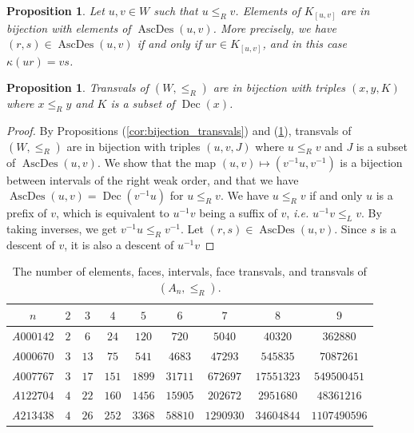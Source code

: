 \documentclass[leqno, 12pt]{amsart}
\numberwithin{equation}{section}
\newcommand{\AD}{\operatorname{AscDes}}
\newcommand{\Dec}{\operatorname{Dec}}
\numberwithin{equation}{section}
\newtheorem{prop}[thm]{Proposition}
\theoremstyle{remark}
\begin{document}
	\begin{prop}
		Let $u,v\in W$ such that $u\le_R v$. Elements of $K_{[u,v]}$ are in bijection with elements of $\AD(u,v)$. More precisely, we have $(r,s) \in \AD(u,v)$ if and only if $ur\in K_{[u,v]}$, and in this case $\kappa(ur)=vs$.
		\label{pr:ascents_descents}
	\end{prop}
	\begin{prop}
		Transvals of $(W,\le_R)$  are in bijection with triples $(x,y,K)$ where $x\le_Ry$ and $K$ is a subset of $\Dec(x)$.
	\end{prop}
	\begin{proof}
		By Propositions (\ref{cor:bijection_transvals}) and (\ref{pr:ascents_descents}), transvals of $(W,\le_R)$ are in bijection with triples $(u,v,J)$ where $u\le_R v$ and $J$ is a subset of $\AD(u,v)$. We show that the map $(u,v)\mapsto (v^{-1}u,v^{-1})$ is a bijection between intervals of the right weak order, and that we have $\AD(u,v)=\Dec(v^{-1}u)$ for $u\le_Rv$. We have $u\le_Rv$ if and only $u$ is a prefix of $v$, which is equivalent to $u^{-1}v$ being a suffix of $v$, \emph{i.e.} $u^{-1}v\le_Lv$. By taking inverses, we get $v^{-1}u\le_Rv^{-1}$. Let $(r,s)\in \AD(u,v)$. Since $s$ is a descent of $v$, it is also a descent of $u^{-1}v$ 
	\end{proof}
	
     \begin{table}[H]
			\centering
			\begin{tabular}{ccccccccc}
			\toprule
			   $n$ & $2$ &$3$ & $4$ & $5$ & $6$ & $7$ & $8$ & $9$   \\ \midrule 
				 $A000142$ & $2$ & $6$ & $24$ & $120$ & $720$ & $5040$ & $40320$ & $362880$ \\ \midrule 
				$A000670$ & $3$ & $13$ & $75$ & $541$ & $4683$ & $47293$ & $545835$ & $7087261$   \\ \midrule 
			   $A007767$ & $3$ & $17$ & $151$ & $1899$ & $31711$ & $672697$ & $17551323$ & $549500451$   \\ \midrule 
				 $A122704$ & $4$ & $22$ & $160$ & $1456$ & $15905$ & $202672$ & $2951680$ & $48361216$   \\  \midrule
			    $A213438$ & $4$ & $26$ & $252$ & $3368$ & $58810$ & $1290930$ & $34604844$ & $1107490596$  \\  \bottomrule
			\end{tabular}
			\caption{\centering The number of elements, faces, intervals, face transvals, and transvals of $(A_n,\le_R)$.}
		\end{table}
		
\end{document}
